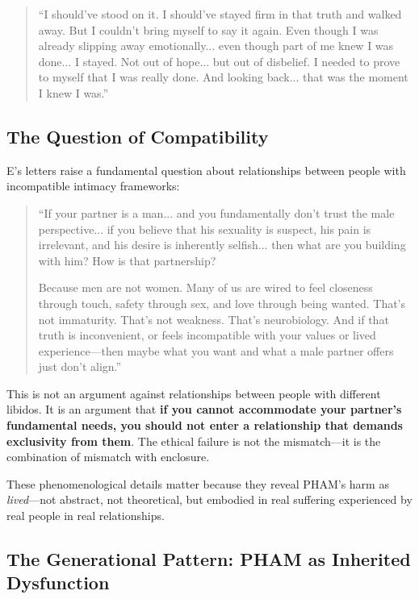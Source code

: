 \documentclass[12pt, letterpaper]{article}
\begin{document}
\begin{quote}
``I should've stood on it. I should've stayed firm in that truth and walked away. But I couldn't bring myself to say it again. Even though I was already slipping away emotionally... even though part of me knew I was done... I stayed. Not out of hope... but out of disbelief. I needed to prove to myself that I was really done. And looking back... that was the moment I knew I was.''
\end{quote}

\subsection{The Question of Compatibility}

E's letters raise a fundamental question about relationships between people with incompatible intimacy frameworks:

\begin{quote}
``If your partner is a man... and you fundamentally don't trust the male perspective... if you believe that his sexuality is suspect, his pain is irrelevant, and his desire is inherently selfish... then what are you building with him? How is that partnership?

Because men are not women. Many of us are wired to feel closeness through touch, safety through sex, and love through being wanted. That's not immaturity. That's not weakness. That's neurobiology. And if that truth is inconvenient, or feels incompatible with your values or lived experience---then maybe what you want and what a male partner offers just don't align.''
\end{quote}

This is not an argument against relationships between people with different libidos. It is an argument that \textbf{if you cannot accommodate your partner's fundamental needs, you should not enter a relationship that demands exclusivity from them}. The ethical failure is not the mismatch---it is the combination of mismatch with enclosure.

These phenomenological details matter because they reveal PHAM's harm as \textit{lived}---not abstract, not theoretical, but embodied in real suffering experienced by real people in real relationships.

\subsection{The Generational Pattern: PHAM as Inherited Dysfunction}
\end{document}
